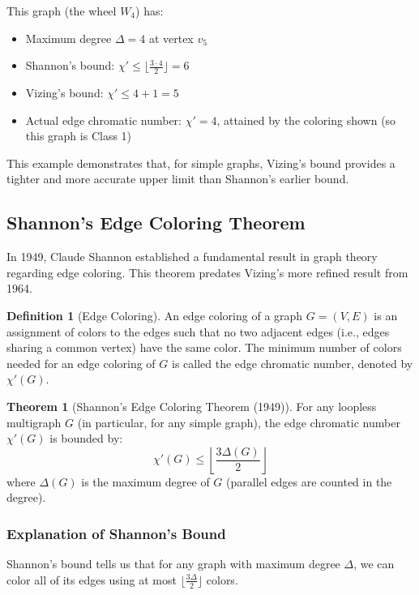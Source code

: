 \documentclass{article}
\theoremstyle{definition}
\newtheorem{theorem}{Theorem}
\newtheorem{definition}{Definition}
\begin{document}
This graph (the wheel $W_4$) has:
\begin{itemize}
    \item Maximum degree $\Delta = 4$ at vertex $v_5$
    \item Shannon's bound: $\chi' \leq \lfloor\frac{3 \cdot 4}{2}\rfloor = 6$
    \item Vizing's bound: $\chi' \leq 4 + 1 = 5$
    \item Actual edge chromatic number: $\chi' = 4$, attained by the coloring shown (so this graph is Class 1)
\end{itemize}

This example demonstrates that, for simple graphs, Vizing's bound provides a tighter and more accurate upper limit than Shannon's earlier bound.

\subsection{Shannon's Edge Coloring Theorem}


In 1949, Claude Shannon established a fundamental result in graph theory regarding edge coloring. This theorem predates Vizing's more refined result from 1964.

\begin{definition}[Edge Coloring]
An edge coloring of a graph $G = (V, E)$ is an assignment of colors to the edges such that no two adjacent edges (i.e., edges sharing a common vertex) have the same color. The minimum number of colors needed for an edge coloring of $G$ is called the edge chromatic number, denoted by $\chi'(G)$.
\end{definition}


\begin{theorem}[Shannon's Edge Coloring Theorem (1949)]
For any loopless multigraph $G$ (in particular, for any simple graph), the edge chromatic number $\chi'(G)$ is bounded by:
\begin{equation}
\chi'(G) \leq \left\lfloor\frac{3\Delta(G)}{2}\right\rfloor
\end{equation}
where $\Delta(G)$ is the maximum degree of $G$ (parallel edges are counted in the degree).
\end{theorem}

\subsubsection{Explanation of Shannon's Bound}

Shannon's bound tells us that for any graph with maximum degree $\Delta$, we can color all of its edges using at most $\lfloor\frac{3\Delta}{2}\rfloor$ colors.
\end{document}
